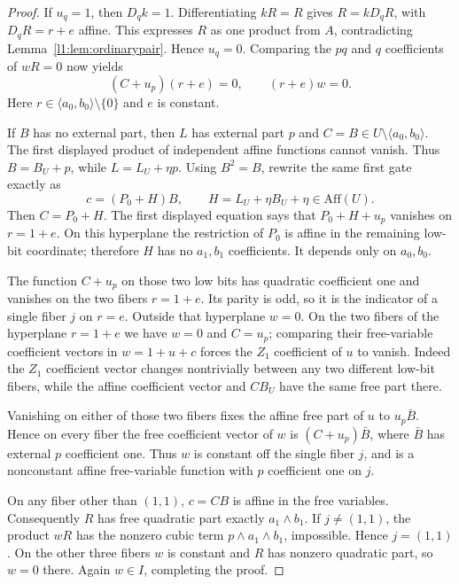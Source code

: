 \documentclass[11pt,a4paper]{article}
\theoremstyle{plain}
\theoremstyle{remark}
\newcommand{\Aff}{\mathrm{Aff}}
\begin{document}
\begin{proof}
If $u_q=1$, then $D_qk=1$. Differentiating $kR=R$ gives $R=kD_qR$, with $D_qR=r+e$ affine. This expresses $R$ as one product from $A$, contradicting Lemma~\ref{l1:lem:ordinarypair}. Hence $u_q=0$. Comparing the $pq$ and $q$ coefficients of $wR=0$ now yields
\[
(C+u_p)(r+e)=0,\qquad (r+e)w=0.
\]
Here $r\in\langle a_0,b_0\rangle\setminus\{0\}$ and $e$ is constant.

If $B$ has no external part, then $L$ has external part $p$ and $C=B\in U\setminus\langle a_0,b_0\rangle$. The first displayed product of independent affine functions cannot vanish. Thus $B=B_U+p$, while $L=L_U+\eta p$. Using $B^2=B$, rewrite the same first gate exactly as
\[
c=(P_0+H)B,\qquad H=L_U+\eta B_U+\eta\in\Aff(U).
\]
Then $C=P_0+H$. The first displayed equation says that $P_0+H+u_p$ vanishes on $r=1+e$. On this hyperplane the restriction of $P_0$ is affine in the remaining low-bit coordinate; therefore $H$ has no $a_1,b_1$ coefficients. It depends only on $a_0,b_0$.

The function $C+u_p$ on those two low bits has quadratic coefficient one and vanishes on the two fibers $r=1+e$. Its parity is odd, so it is the indicator of a single fiber $j$ on $r=e$. Outside that hyperplane $w=0$. On the two fibers of the hyperplane $r=1+e$ we have $w=0$ and $C=u_p$; comparing their free-variable coefficient vectors in $w=1+u+c$ forces the $Z_1$ coefficient of $u$ to vanish. Indeed the $Z_1$ coefficient vector changes nontrivially between any two different low-bit fibers, while the affine coefficient vector and $CB_U$ have the same free part there.

Vanishing on either of those two fibers fixes the affine free part of $u$ to $u_p\bar B$. Hence on every fiber the free coefficient vector of $w$ is $(C+u_p)\bar B$, where $\bar B$ has external $p$ coefficient one. Thus $w$ is constant off the single fiber $j$, and is a nonconstant affine free-variable function with $p$ coefficient one on $j$.

On any fiber other than $(1,1)$, $c=CB$ is affine in the free variables. Consequently $R$ has free quadratic part exactly $a_1\wedge b_1$. If $j\ne(1,1)$, the product $wR$ has the nonzero cubic term $p\wedge a_1\wedge b_1$, impossible. Hence $j=(1,1)$. On the other three fibers $w$ is constant and $R$ has nonzero quadratic part, so $w=0$ there. Again $w\in I$, completing the proof.
\end{proof}
\end{document}
